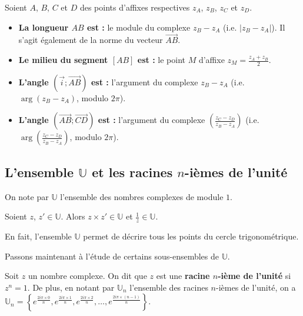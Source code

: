 	\begin{formula}[Propriétés]
		Soient $A$, $B$, $C$ et $D$ des points d'affixes respectives $z_A$, $z_B$, $z_C$ et $z_D$.
		\begin{itemize}
			\item \textbf{La longueur $AB$ est :} le module du complexe $z_B - z_A$ (i.e. $|z_B - z_A|$). Il s'agit également de la norme du vecteur $\overrightarrow{AB}$.
			\item \textbf{Le milieu du segment $[AB]$ est :} le point $M$ d'affixe $z_{M} = \frac{z_A + z_B}{2}$.
			\item \textbf{L'angle $(\overrightarrow{i}; \overrightarrow{AB})$ est :} l'argument du complexe $z_B - z_A$ (i.e. $\operatorname{arg}(z_B - z_A)$, modulo $2\pi$).
			\item \textbf{L'angle $(\overrightarrow{AB}; \overrightarrow{CD})$ est :} l'argument du complexe $\left(\frac{z_C - z_D}{z_B - z_A}\right)$ (i.e. $\operatorname{arg}\left(\frac{z_C - z_D}{z_B - z_A}\right)$, modulo $2\pi$).
		\end{itemize}
	\end{formula}

	\subsection{L'ensemble \texorpdfstring{$\mathbb{U}$}{U} et les racines \texorpdfstring{$n$}{n}-ièmes de l'unité}

	\begin{formula}
		On note par $\mathbb{U}$ l'ensemble des nombres complexes de module $1$.
	\end{formula}

	\begin{formula}
		Soient $z$, $z' \in \mathbb{U}$. Alors $z \times z' \in \mathbb{U}$ et $\frac{1}{z} \in \mathbb{U}$.
	\end{formula}

	En fait, l'ensemble $\mathbb{U}$ permet de décrire tous les points du cercle trigonométrique.

	Passons maintenant à l'étude de certains sous-ensembles de $\mathbb{U}$.

	\begin{formula}
		Soit $z$ un nombre complexe. On dit que $z$ est une \textbf{racine $n$-ième de l'unité} si $z^n = 1$.
		\newpar
		De plus, en notant par $\mathbb{U}_n$ l'ensemble des racines $n$-ièmes de l'unité, on a
		\newline
		$\mathbb{U}_n = \left\{ e^{\frac{2i\pi \times 0}{n}}, e^{\frac{2i\pi \times 1}{n}}, e^{\frac{2i\pi \times 2}{n}}, \dots, e^{\frac{2i\pi \times (n-1)}{n}} \right\}$.
	\end{formula}

